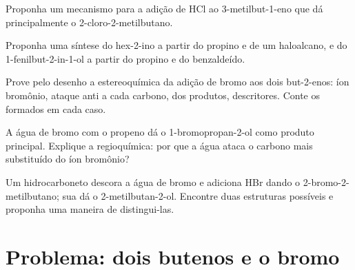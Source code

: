 \begin{exercise}[$\star\star$]\label{exo:b1:electrophilic-additions:8}
Proponha um mecanismo para a adição de HCl ao 3-metilbut-1-eno que dá
principalmente o 2-cloro-2-metilbutano.
\end{exercise}

\begin{exercise}[$\star\star$]\label{exo:b1:electrophilic-additions:9}
Proponha uma síntese do hex-2-ino a partir do propino e de um
haloalcano, e do 1-fenilbut-2-in-1-ol a partir do propino e do benzaldeído.
\end{exercise}

\begin{exercise}[$\star\star\star$]\label{exo:b1:electrophilic-additions:10}
Prove pelo desenho a estereoquímica da adição de bromo aos dois
but-2-enos: íon bromônio, ataque anti a cada carbono,  dos produtos, descritores. Conte os  formados em
cada caso.
\end{exercise}

\begin{exercise}[$\star\star\star$]\label{exo:b1:electrophilic-additions:11}
A água de bromo com o propeno dá o 1-bromopropan-2-ol como produto
principal. Explique a regioquímica: por que a água ataca o carbono mais
substituído do íon bromônio?
\end{exercise}

\begin{exercise}[$\star\star\star$]\label{exo:b1:electrophilic-additions:12}
Um hidrocarboneto  descora a água de bromo e adiciona HBr dando
o 2-bromo-2-metilbutano; sua  dá o 2-metilbutan-2-ol. Encontre
duas estruturas possíveis e proponha uma maneira de distingui-las.
\end{exercise}

\section{Problema: dois butenos e o bromo}

